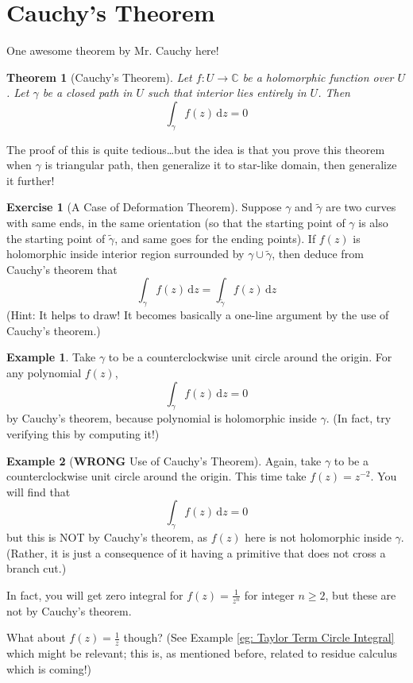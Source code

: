 \documentclass[a4paper, 12pt]{article}
\newtheorem{theorem}{Theorem}
\theoremstyle{definition}
\newtheorem{exercise}{Exercise}
\newtheorem{example}{Example}
\numberwithin{theorem}{section}
\numberwithin{definition}{section}
\numberwithin{exercise}{section}
\numberwithin{remark}{section}
\numberwithin{figure}{section}
\numberwithin{example}{section}
\newcommand{\C}{\mathbb{C}}
\newcommand{\intd}{\,\text{d}}
\begin{document}
\section{Cauchy's Theorem}
One awesome theorem by Mr. Cauchy here!
\begin{theorem}[Cauchy's Theorem]
    Let $f:U \rightarrow \C$ be a holomorphic function over $U$.
    Let $\gamma$ be a closed path in $U$ such that interior lies entirely in $U$.
    Then
    \begin{equation*}
        \int_{\gamma} f(z) \intd z = 0
    \end{equation*}
\end{theorem}
The proof of this is quite tedious\dots but the idea is that
you prove this theorem when $\gamma$ is triangular path,
then generalize it to star-like domain,
then generalize it further!
\begin{exercise}[A Case of Deformation Theorem]
    Suppose $\gamma$ and $\tilde\gamma$ are two curves with same ends,
    in the same orientation (so that the starting point of $\gamma$ is also the starting point
    of $\tilde\gamma$, and same goes for the ending points).
    If $f(z)$ is holomorphic inside interior region surrounded by $\gamma \cup \tilde\gamma$,
    then deduce from Cauchy's theorem that
    \begin{equation*}
        \int_{\gamma} f(z) \intd z = \int_{\tilde\gamma} f(z) \intd z
    \end{equation*}
    (Hint: It helps to draw! It becomes basically a one-line argument by the use of Cauchy's theorem.)
\end{exercise}
\begin{example}
    Take $\gamma$ to be a counterclockwise unit circle around the origin.
    For any polynomial $f(z)$,
    \begin{equation*}
        \int_{\gamma} f(z) \intd z = 0
    \end{equation*}
    by Cauchy's theorem, because polynomial is holomorphic inside $\gamma$.
    (In fact, try verifying this by computing it!)
\end{example}
\begin{example}[\textbf{WRONG} Use of Cauchy's Theorem]
    Again, take $\gamma$ to be a counterclockwise unit circle around the origin.
    This time take $f(z) = z^{-2}$.
    You will find that
    \begin{equation*}
        \int_{\gamma} f(z) \intd z = 0
    \end{equation*}
    but this is NOT by Cauchy's theorem, as $f(z)$ here is not holomorphic inside $\gamma$.
    (Rather, it is just a consequence of it having a primitive that does not cross a branch cut.)

    In fact, you will get zero integral for $f(z) = \frac{1}{z^n}$ for integer $n \geq 2$,
    but these are not by Cauchy's theorem.

    What about $f(z) = \frac{1}{z}$ though? (See Example \ref{eg: Taylor Term Circle Integral} which might be relevant;
    this is, as mentioned before, related to residue calculus which is coming!)
\end{example}
\end{document}
